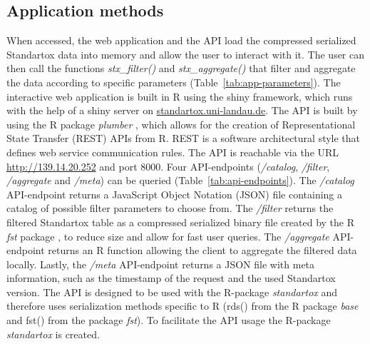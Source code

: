 \documentclass[journal,datadescriptor,accept,moreauthors,pdftex]{Definitions/mdpi}
\begin{document}
\subsection{Application methods}
When accessed, the web application and the API load the compressed serialized Standartox data into memory and allow the user to interact with it. The user can then call the functions \textit{stx\_filter()} and \textit{stx\_aggregate()} that filter and aggregate the data according to specific parameters (Table~\ref{tab:app-parameters}). The interactive web application is built in R using the shiny framework, which runs with the help of a shiny server \citep{chang_shiny_2018} on \url{standartox.uni-landau.de}. The API is built by using the R package \textit{plumber} \citep{trestletechnologyllc_plumber_2018}, which allows for the creation of Representational State Transfer (REST) APIs from R. REST is a software architectural style that defines web service communication rules. The API is reachable via the URL \url{http://139.14.20.252} and port 8000. Four API-endpoints (\textit{/catalog}, \textit{/filter}, \textit{/aggregate} and \textit{/meta}) can be queried (Table~\ref{tab:api-endpoints}). The \textit{/catalog} API-endpoint returns a JavaScript Object Notation (JSON) file containing a catalog of possible filter parameters to choose from. The \textit{/filter} returns the filtered Standartox table as a compressed serialized binary file created by the R \textit{fst} package \citep{klik_fst_2019}, to reduce size and allow for fast user queries. The \textit{/aggregate} API-endpoint returns an R function allowing the client to aggregate the filtered data locally. Lastly, the \textit{/meta} API-endpoint returns a JSON file with meta information, such as the timestamp of the request and the used Standartox version. The API is designed to be used with the R-package \textit{standartox} and therefore uses serialization methods specific to R (rds() from the R package \textit{base} and fst() from the package \textit{fst}). To facilitate the API usage the R-package \textit{standartox} is created.
\end{document}
